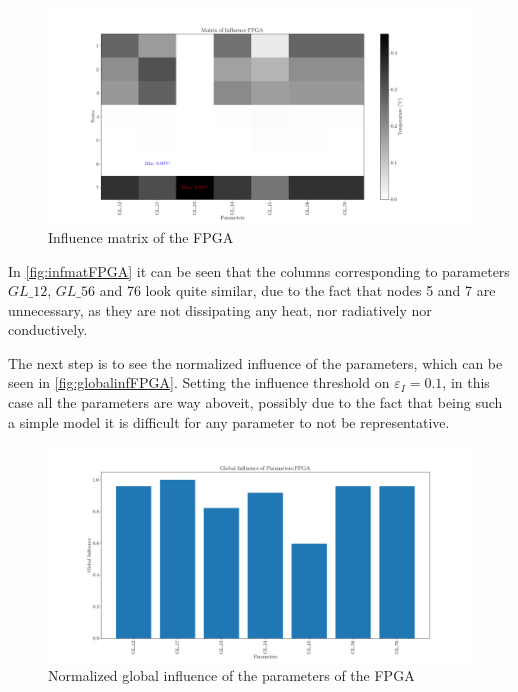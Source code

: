      \begin{figure}[H]
         \centering
         \includegraphics[width=\textwidth]{Figures/FPGA/FPGA-infmat.png}
         \caption{Influence matrix of the FPGA}
         \label{fig:infmatFPGA}
     \end{figure}

In \autoref{fig:infmatFPGA} it can be seen that the columns corresponding to parameters $GL\_12$, $GL\_56$ and 76 look quite similar, due to the fact that nodes 5 and 7 are unnecessary, as they are not dissipating any heat, nor radiatively nor conductively. 

The next step is to see the normalized influence of the parameters, which can be seen in \autoref{fig:globalinfFPGA}. Setting the influence threshold on $\varepsilon_I = 0.1$, in this case all the parameters are way aboveit, possibly due to the fact that being such a simple model it is difficult for any parameter to not be representative.
\begin{figure}[H]
    \centering
    \includegraphics[width=\textwidth]{Figures/FPGA/FPGA-infglobal.png}
    \caption{Normalized global influence of the parameters of the FPGA}
    \label{fig:globalinfFPGA}
\end{figure}
    
